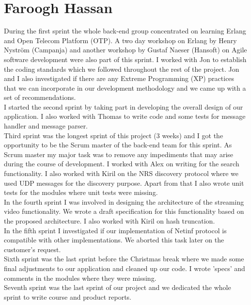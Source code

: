 \section{Faroogh Hassan}

During the first sprint the whole back-end group concentrated on learning Erlang and Open Telecom Platform (OTP). A two day workshop on Erlang by Henry Nystr\"om (Campanja) and another workshop by Gustaf Naeser (Hansoft) on Agile software development were also part of this sprint. I worked with Jon to establish the coding standards which we followed throughout the rest of the project. Jon and I also investigated if there are any Extreme Programming (XP) practices that we can incorporate in our development methodology and we came up with a set of recommendations. \\

I started the second sprint by taking part in developing the overall design of our application. I also worked with Thomas to write code and some tests for message handler and message parser.\\

Third sprint was the longest sprint of this project (3 weeks) and I got the opportunity to be the Scrum master of the back-end team for this sprint. As Scrum master my major task was to remove any impediments that may arise during the course of development. I worked with Alex on writing for the search functionality. I also worked with Kiril on the NRS discovery protocol where we used UDP messages for the discovery purpose. Apart from that I also wrote unit tests for the modules where unit tests were missing. \\

In the fourth sprint I was involved in designing the architecture of the streaming video functionality. We wrote a draft specification for this functionality based on the proposed architecture. I also worked with Kiril on hash truncation. \\

In the fifth sprint I investigated if our implementation of Netinf protocol is compatible with other implementations. We aborted this task later on the customer's request. \\

Sixth sprint was the last sprint before the Christmas break where we made some final adjustments to our application and cleaned up our code. I wrote 'specs' and comments in the modules where they were missing. \\

Seventh sprint was the last sprint of our project and we dedicated the whole sprint to write course and product reports. \\
